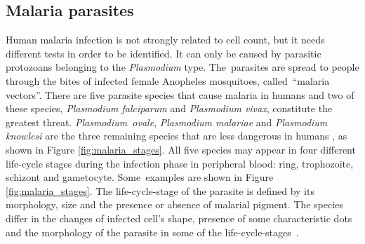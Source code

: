 \documentclass[final,a4paper,12pt,english]{UnicaPhdThesis3}
\begin{document}
\subsection{Malaria parasites}
Human malaria infection is not strongly related to cell count, but it needs different tests in order to be identified. It can only be caused by parasitic protozoans belonging to the \emph{Plasmodium} type. The~parasites are spread to people through the bites of infected female Anopheles mosquitoes, called~``malaria vectors''.
There are five parasite species that cause malaria in humans and two of these species, \emph{Plasmodium falciparum} and \emph{Plasmodium vivax}, constitute the greatest threat. \emph{Plasmodium~ovale}, \emph{Plasmodium malariae} and \emph{Plasmodium knowlesi} are the three remaining species that are less dangerous in humans \cite{WHO_dec_2016}, as shown in Figure \ref{fig:malaria_stages}.
All five species may appear in four different life-cycle stages during the infection phase in peripheral blood: ring, trophozoite, schizont and gametocyte. Some~examples are shown in Figure \ref{fig:malaria_stages}.
The life-cycle-stage of the parasite is defined by its morphology, size and the presence or absence of malarial pigment.
The species differ in the changes of infected cell's shape, presence of some characteristic dots and the morphology of the parasite in some of the life-cycle-stages~\cite{Somasekar2011}.
\end{document}
